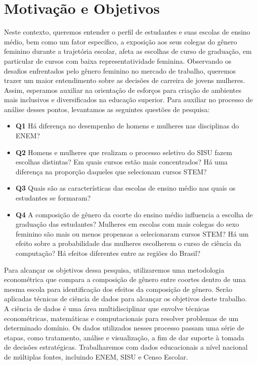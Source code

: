 \section{Motivação e Objetivos}
Neste contexto, queremos entender o perfil de estudantes e suas escolas de ensino médio, bem como um fator específico, a exposição aos seus colegas do gênero feminino durante a trajetória escolar, afeta as escolhas de curso de graduação, em particular de cursos com baixa representatividade feminina. Observando os desafios enfrentados pelo gênero feminino no mercado de trabalho, queremos trazer um maior entendimento sobre as decisões de carreira de jovens mulheres. Assim, esperamos auxiliar na orientação de esforços para criação de ambientes mais inclusivos e diversificados na educação superior. Para auxiliar no processo de análise desses pontos, levantamos as seguintes questões de pesquisa:

\begin{itemize}
  \item \textbf{Q1} Há diferença no desempenho de homens e mulheres nas disciplinas do ENEM?
  \item \textbf{Q2} Homens e mulheres que realizam o processo seletivo do SISU fazem escolhas distintas? Em quais cursos estão mais concentrados? Há uma diferença na proporção daqueles que selecionam cursos STEM?
  \item \textbf{Q3} Quais são as características das escolas de ensino médio nas quais os estudantes se formaram?
  \item \textbf{Q4} A composição de gênero da coorte do ensino médio influencia a escolha de graduação das estudantes? Mulheres em escolas com mais colegas do sexo feminino são mais ou menos propensas a selecionaram cursos STEM? Há um efeito sobre a probabilidade das mulheres escolherem o curso de ciência da computação? Há efeitos diferentes entre as regiões do Brasil?
\end{itemize}

Para alcançar os objetivos dessa pesquisa, utilizaremos uma metodologia econométrica que compara a composição de gênero entre coortes dentro de uma mesma escola para identificação dos efeitos da composição de gênero. Serão aplicadas técnicas de ciência de dados para alcançar os objetivos deste trabalho. A ciência de dados é uma área multidisciplinar que envolve técnicas econométricas, matemáticas e computacionais para resolver problemas de um determinado domínio. Os dados utilizados nesses processo passam uma série de etapas, como tratamento, análise e visualização, a fim de dar suporte à tomada de decisões estratégicas. Trabalharemos com dados educacionais a nível nacional de múltiplas fontes, incluindo ENEM, SISU e Censo Escolar.


